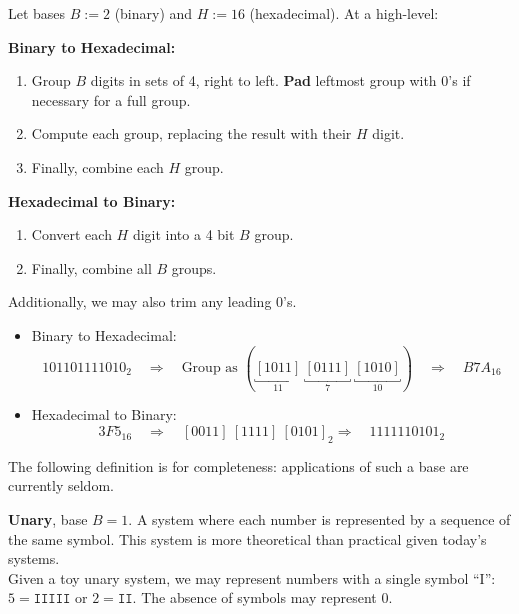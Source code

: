 \begin{theo}

    Let bases \( B:=2 \) (binary) and \( H:=16 \) (hexadecimal). At a high-level:

    \vspace{.5em}
    
    \noindent \textbf{Binary to Hexadecimal:}
    \begin{enumerate}
        \item Group $B$ digits in sets of 4, right to left. \textbf{Pad} leftmost group with 0's if necessary for a full group.
        \item Compute each group, replacing the result with their $H$ digit.
        \item Finally, combine each $H$ group.
    \end{enumerate}
    
    \noindent \textbf{Hexadecimal to Binary:}
    \begin{enumerate}
        \item Convert each $H$ digit into a 4 bit $B$ group.
        \item Finally, combine all $B$ groups.
    \end{enumerate}
    \noindent
    Additionally, we may also trim any leading 0's.
\end{theo}

\noindent
\begin{Example}
    \begin{itemize}
        \item Binary to Hexadecimal:
        \[
        101101111010_2 \quad \Rightarrow \quad \text{Group as } (\underbracket{[1011]}_{11} \ \underbracket{[0111]}_{7} \ \underbracket{[1010]}_{10}) \quad \Rightarrow \quad B7A_{16}
        \]
        \item Hexadecimal to Binary:
        \[
        3F5_{16} \quad \Rightarrow \quad [0011]\ [1111]\ [0101]_2 \Rightarrow \quad 1111110101_2
        \]
        \noindent
    \end{itemize}

\end{Example}

\noindent
The following definition is for completeness: applications of such a base are currently seldom.
\begin{Def}[Unary]
    
    \textbf{Unary}, base $B=1$. A system where each number is represented by a sequence of the same symbol. 
    This system is more theoretical than practical given today's systems.\\

    \noindent
    Given a toy unary system, we may represent numbers with a single symbol ``I'': $5 = \texttt{IIIII}$ or $2= \texttt{II}$. 
    The absence of symbols may represent 0.
\end{Def}

